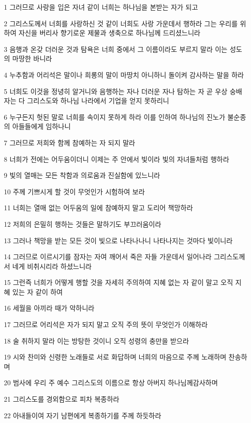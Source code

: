\par 1 그러므로 사랑을 입은 자녀 같이 너희는 하나님을 본받는 자가 되고
\par 2 그리스도께서 너희를 사랑하신 것 같이 너희도 사랑 가운데서 행하라 그는 우리를 위하여 자신을 버리사 향기로운 제물과 생축으로 하나님께 드리셨느니라
\par 3 음행과 온갖 더러운 것과 탐욕은 너희 중에서 그 이름이라도 부르지 말라 이는 성도의 마땅한 바니라
\par 4 누추함과 어리석은 말이나 희롱의 말이 마땅치 아니하니 돌이켜 감사하는 말을 하라
\par 5 너희도 이것을 정녕히 알거니와 음행하는 자나 더러운 자나 탐하는 자 곧 우상 숭배자는 다 그리스도와 하나님 나라에서 기업을 얻지 못하리니
\par 6 누구든지 헛된 말로 너희를 속이지 못하게 하라 이를 인하여 하나님의 진노가 불순종의 아들들에게 임하나니
\par 7 그러므로 저희와 함께 참예하는 자 되지 말라
\par 8 너희가 전에는 어두움이더니 이제는 주 안에서 빛이라 빛의 자녀들처럼 행하라
\par 9 빛의 열매는 모든 착함과 의로움과 진실함에 있느니라
\par 10 주께 기쁘시게 할 것이 무엇인가 시험하여 보라
\par 11 너희는 열매 없는 어두움의 일에 참예하지 말고 도리어 책망하라
\par 12 저희의 은밀히 행하는 것들은 말하기도 부끄러움이라
\par 13 그러나 책망을 받는 모든 것이 빛으로 나타나나니 나타나지는 것마다 빛이니라
\par 14 그러므로 이르시기를 잠자는 자여 깨어서 죽은 자들 가운데서 일어나라 그리스도께서 네게 비취시리라 하셨느니라
\par 15 그런즉 너희가 어떻게 행할 것을 자세히 주의하여 지혜 없는 자 같이 말고 오직 지혜 있는 자 같이 하여
\par 16 세월을 아끼라 때가 악하니라
\par 17 그러므로 어리석은 자가 되지 말고 오직 주의 뜻이 무엇인가 이해하라
\par 18 술 취하지 말라 이는 방탕한 것이니 오직 성령의 충만을 받으라
\par 19 시와 찬미와 신령한 노래들로 서로 화답하며 너희의 마음으로 주께 노래하며 찬송하며
\par 20 범사에 우리 주 예수 그리스도의 이름으로 항상 아버지 하나님께감사하며
\par 21 그리스도를 경외함으로 피차 복종하라
\par 22 아내들이여 자기 남편에게 복종하기를 주께 하듯하라
